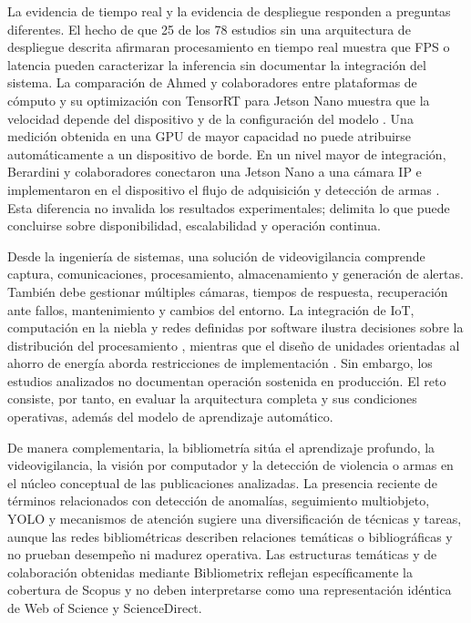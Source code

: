 \documentclass[pdflatex,sn-mathphys-num]{sn-jnl}%
\theoremstyle{thmstyleone}%
\theoremstyle{thmstyletwo}%
\theoremstyle{thmstylethree}%
\begin{document}
La evidencia de tiempo real y la evidencia de despliegue responden a preguntas diferentes. El hecho de que 25 de los 78 estudios sin una arquitectura de despliegue descrita afirmaran procesamiento en tiempo real muestra que FPS o latencia pueden caracterizar la inferencia sin documentar la integración del sistema. La comparación de Ahmed y colaboradores entre plataformas de cómputo y su optimización con TensorRT para Jetson Nano muestra que la velocidad depende del dispositivo y de la configuración del modelo \cite{ahmed2022}. Una medición obtenida en una GPU de mayor capacidad no puede atribuirse automáticamente a un dispositivo de borde. En un nivel mayor de integración, Berardini y colaboradores conectaron una Jetson Nano a una cámara IP e implementaron en el dispositivo el flujo de adquisición y detección de armas \cite{berardini2024}. Esta diferencia no invalida los resultados experimentales; delimita lo que puede concluirse sobre disponibilidad, escalabilidad y operación continua.

Desde la ingeniería de sistemas, una solución de videovigilancia comprende captura, comunicaciones, procesamiento, almacenamiento y generación de alertas. También debe gestionar múltiples cámaras, tiempos de respuesta, recuperación ante fallos, mantenimiento y cambios del entorno. La integración de IoT, computación en la niebla y redes definidas por software ilustra decisiones sobre la distribución del procesamiento \cite{fathy2022}, mientras que el diseño de unidades orientadas al ahorro de energía aborda restricciones de implementación \cite{pereatrigo2023}. Sin embargo, los estudios analizados no documentan operación sostenida en producción. El reto consiste, por tanto, en evaluar la arquitectura completa y sus condiciones operativas, además del modelo de aprendizaje automático.

De manera complementaria, la bibliometría sitúa el aprendizaje profundo, la videovigilancia, la visión por computador y la detección de violencia o armas en el núcleo conceptual de las publicaciones analizadas. La presencia reciente de términos relacionados con detección de anomalías, seguimiento multiobjeto, YOLO y mecanismos de atención sugiere una diversificación de técnicas y tareas, aunque las redes bibliométricas describen relaciones temáticas o bibliográficas y no prueban desempeño ni madurez operativa. Las estructuras temáticas y de colaboración obtenidas mediante Bibliometrix reflejan específicamente la cobertura de Scopus y no deben interpretarse como una representación idéntica de Web of Science y ScienceDirect.
\end{document}
